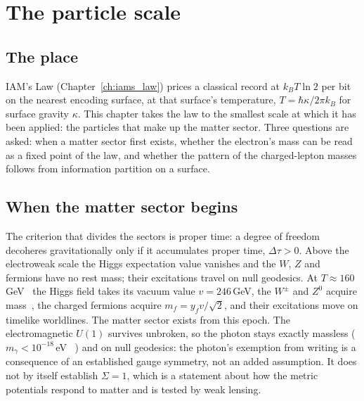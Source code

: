 \chapter{The particle scale}\label{ch:particle}

\section*{The place}
IAM's Law (Chapter~\ref{ch:iams_law}) prices a classical record at $k_BT\ln2$ per bit on the nearest encoding surface, at that surface's temperature,
$T=\hbar\kappa/2\pi k_B$ for surface gravity $\kappa$. This chapter takes the law to the smallest scale at which it has been applied: the particles that
make up the matter sector. Three questions are asked: when a matter sector first exists, whether the electron's mass can be read as a fixed point of the
law, and whether the pattern of the charged-lepton masses follows from information partition on a surface.

\section{When the matter sector begins}
The criterion that divides the sectors is proper time: a degree of freedom decoheres gravitationally only if it accumulates proper time, $\Delta\tau>0$.
Above the electroweak scale the Higgs expectation value vanishes and the $W$, $Z$ and fermions have no rest mass; their excitations travel on null
geodesics. At $T\approx160$\,GeV~\cite{DOnofrio2016} the Higgs field takes its vacuum value $v=246$\,GeV, the $W^\pm$ and $Z^0$ acquire mass~\cite{Englert1964,Higgs1964}, the charged fermions acquire
$m_f=y_fv/\sqrt2$, and their excitations move on timelike worldlines. The matter sector exists from this epoch. \derived The electromagnetic $U(1)$ survives
unbroken, so the photon stays exactly massless ($m_\gamma<10^{-18}$\,eV~\cite{PDG2022} \observed) and on null geodesics: the photon's exemption from writing is a consequence
of an established gauge symmetry, not an added assumption. It does not by itself establish $\Sigma=1$, which is a statement about how the metric
potentials respond to matter and is tested by weak lensing.

